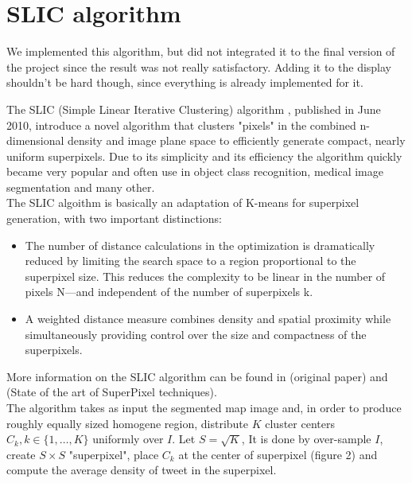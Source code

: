\section{ SLIC algorithm}
\label{sec:K-M_clustering}

We implemented this algorithm, but did not integrated it to the final version of the project since the result was not really satisfactory. Adding it to the display shouldn't be hard though, since everything is already implemented for it. 

The SLIC (Simple Linear Iterative Clustering)  algorithm \cite{SLIC1}, published in June 2010, introduce a novel algorithm that clusters "pixels" in the combined n-dimensional density and image plane space to efficiently generate compact, nearly uniform superpixels. Due to its simplicity and its efficiency the algorithm quickly became very popular and often use in object class recognition, medical image segmentation and many other.\\

The SLIC algoithm is basically an adaptation of K-means for superpixel generation, with two important distinctions:

\begin{itemize}

\item The number of distance calculations in the optimization is dramatically reduced by limiting the search space to a region proportional to the superpixel size. This reduces the complexity to be linear in the number of pixels N—and independent of the number of superpixels k.

\item A weighted distance measure combines density and spatial proximity while simultaneously providing control over the size and compactness of the superpixels.

\end{itemize}

More information on the SLIC algorithm can be found in \cite{SLIC1} (original paper) and \cite{SLIC2} (State of the art of SuperPixel techniques).\\ 

The algorithm takes as input the segmented map image and, in order to produce roughly equally sized homogene region, distribute $K$ cluster centers $C_k, k \in \{1, \ldots, K \}$ uniformly over $I$. Let $S = \sqrt{K}$, It is done by over-sample $I$, create $S \times S$ "superpixel", place $C_k$ at the center of superpixel (figure 2) and compute the average density of tweet in the superpixel. 

